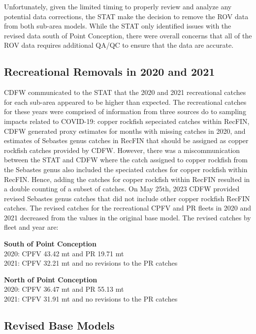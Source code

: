 \documentclass[
  letterpaper,
]{article}
\begin{document}
Unfortunately, given the limited timing to properly review and analyze any potential data corrections, the STAT make the decision to remove the ROV data from both sub-area models. While the STAT only identified issues with the revised data south of Point Conception, there were overall concerns that all of the ROV data requires additional QA/QC to ensure that the data are accurate.

\hypertarget{recreational-removals-in-2020-and-2021}{%
\subsection{Recreational Removals in 2020 and 2021}\label{recreational-removals-in-2020-and-2021}}

CDFW communicated to the STAT that the 2020 and 2021 recreational catches for each sub-area appeared to be higher than expected. The recreational catches for these years were comprised of information from three sources do to sampling impacts related to COVID-19: copper rockfish sepeciated catches within RecFIN, CDFW generated proxy estimates for months with missing catches in 2020, and estimates of Sebastes genus catches in RecFIN that should be assigned as copper rockfish catches provided by CDFW. However, there was a miscommunication between the STAT and CDFW where the catch assigned to copper rockfish from the Sebastes genus also included the speciated catches for copper rockfish within RecFIN. Hence, adding the catches for copper rockfish within RecFIN resulted in a double counting of a subset of catches. On May 25th, 2023 CDFW provided revised Sebastes genus catches that did not include other copper rockfish RecFIN catches. The revised catches for the recreational CPFV and PR fleets in 2020 and 2021 decreased from the values in the original base model. The revised catches by fleet and year are:

\textbf{South of Point Conception}\\
2020: CPFV 43.42 mt and PR 19.71 mt\\
2021: CPFV 32.21 mt and no revisions to the PR catches

\textbf{North of Point Conception}\\
2020: CPFV 36.47 mt and PR 55.13 mt\\
2021: CPFV 31.91 mt and no revisions to the PR catches

\hypertarget{revised-base-models}{%
\subsection{Revised Base Models}\label{revised-base-models}}
\end{document}
